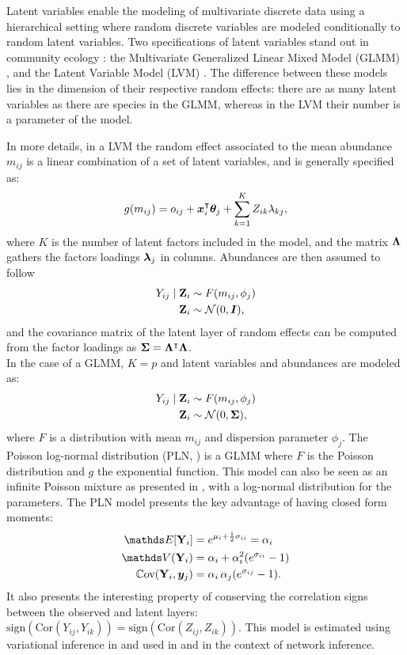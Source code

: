 Latent variables enable the modeling of multivariate discrete data using a hierarchical setting where random discrete variables are modeled conditionally to random latent variables.  Two specifications of  latent variables stand out in community ecology \citep{WBO15}:  the Multivariate Generalized Linear Mixed Model (GLMM) \citep{OHS10, PTM14}, and the Latent Variable Model (LVM)  \citep{OAP16, OTN17}. The difference between these models lies in the dimension of their respective random effects: there are as many latent variables as there are species in the GLMM, whereas in the LVM their number is a parameter of the model. 

In more details, in a LVM the random effect associated to the mean abundance $m_{ij}$ is a linear combination of a set of latent variables, and is generally specified as:
 $$g(m_{ij}) = o_{ij}+{\boldsymbol{x}}_i^\intercal  {\boldsymbol{\theta}}_j +\sum_{k=1}^K Z_{ik} \lambda_{kj},$$
 where $K$ is the number of latent factors included in the model, and the matrix ${\boldsymbol{\Lambda}}$ gathers the factors loadings ${\boldsymbol{\lambda}}_j$ in columns. Abundances are then assumed to follow
 \begin{align*}
 Y_{ij}\mid {\bf Z}_i &\sim F(m_{ij}, \phi_j)\\
{\bf Z}_i&\sim \mathcal{N}(0, \boldsymbol{I}),
 \end{align*}
and the covariance matrix of the latent layer of random effects can be computed from the factor loadings as ${\boldsymbol{\Sigma}}={\boldsymbol{\Lambda}}^\intercal {\boldsymbol{\Lambda}}$.\\

In the case of a GLMM, $K=p$ and latent variables and abundances are  modeled as:
 \begin{align*}
 Y_{ij}\mid {\bf Z}_i &\sim F(m_{ij}, \phi_j)\\
 {\bf Z}_i &\sim \mathcal{N}(0, {\boldsymbol{\Sigma}}),
 \end{align*} 
 where $F$ is a distribution with mean $m_{ij}$ and dispersion parameter $\phi_j$. The Poisson log-normal distribution (PLN, \citet{AiH89}) is a GLMM where $F$ is the Poisson distribution and $g$ the exponential function.  This model can also be seen as an infinite Poisson mixture as presented in \citet{inouye}, with a log-normal distribution for the parameters. The PLN model presents the key advantage of having  closed form moments:
 \begin{align*}
 \Esp[\Yb_i] &= e^{\mu_i + \frac{1}{2} \sigma_{ii}} = \alpha_i\\
 \Var(\Yb_i) &=  \alpha_i+ \alpha_i^2(e^{\sigma_{ii}} -1)\\
 \Cov (\Yb_i, \yb_j) &=  \alpha_i\, \alpha_j (e^{\sigma_{ij}} -1).
 \end{align*}
 It also presents the interesting property of conserving the correlation signs between the observed and latent layers: $\text{sign}(\text{Cor}(Y_{ij}, Y_{ik})) = \text{sign}(\text{Cor}(Z_{ij}, Z_{ik}))$. This model is  estimated using variational inference in \citet{CMR18} and used in \citet{MInt} and \citet{PLNnetwork} in the context of network inference.
 
